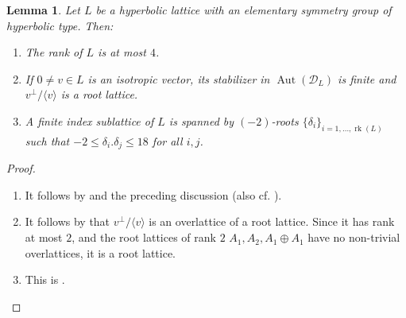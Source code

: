 \documentclass[11pt,letterpaper]{amsart}
\newcommand{\Si}[1]{\textcolor{blue}{(Si: #1)}}
\newcommand{\Gi}[1]{\textcolor{red}{(Gi: #1)}}
\DeclareMathOperator{\rk}{rk}
\DeclareMathOperator{\Aut}{Aut}
\newcommand{\RR}{\mathbb{R}}
\newcommand{\ZZ}{\mathbb{Z}}
\newcommand{\HH}{\mathbb{H}}
\newcommand{\D}{\mathcal{D}}
\newtheorem{lemma}[theorem]{Lemma}
\theoremstyle{definition}
\theoremstyle{remark}
\begin{document}
\begin{lemma}\label{lem:detect_virtually_abelian}
Let $L$ be a hyperbolic lattice with an elementary symmetry group of hyperbolic type. Then:
\begin{enumerate}
\item[(1)] The rank of $L$ is at most $4$.
\item[(2)] If $0\ne v\in L$ is an isotropic vector, its stabilizer in $\Aut(\D_L)$ is finite and $v^\perp/\langle v \rangle$ is a root lattice. 
\item[(3)] A finite index sublattice of $L$ is spanned by $(-2)$-roots $\{\delta_i\}_{i=1,\ldots,\rk(L)}$ such that $-2 \le \delta_i . \delta_j \le 18$ for all $i,j$.
\end{enumerate}
\end{lemma}
\begin{proof}\hfill
\begin{enumerate}
\item[(1)] It follows by \cite[Theorem~9.1.1]{nikulin.factor.groups} and the preceding discussion (also cf. \cite[Theorem~3.9]{brandhorst.mezzedimi}).
\item[(2)] It follows by \cite[Theorem~3.9~and~Proposition~3.2]{brandhorst.mezzedimi} that $v^\perp/ \langle v \rangle$ is an overlattice of a root lattice. Since it has rank at most $2$, and the root lattices of rank $2$ $A_1,A_2,A_1\oplus A_1$ have no non-trivial overlattices, it is a root lattice.
\item[(3)] This is \cite[Lemma~1]{nikulin.interesting}. \qedhere
\end{enumerate}
\end{proof}
\end{document}
